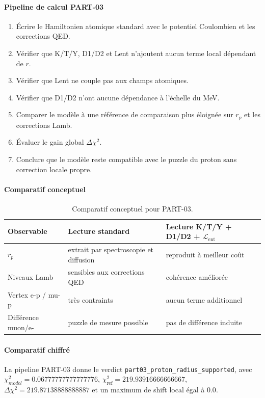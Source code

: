 \documentclass[11pt,a4paper]{article}
\newcommand{\Lent}{\mathcal{L}_{\mathrm{ent}}}
\begin{document}
\paragraph{Pipeline de calcul PART-03}
\begin{enumerate}[leftmargin=*,itemsep=0.2em,topsep=0.2em]
\item Écrire le Hamiltonien atomique standard avec le potentiel Coulombien et les corrections QED.
\item Vérifier que K/T/Y, D1/D2 et Lent n'ajoutent aucun terme local dépendant de $r$.
\item Vérifier que Lent ne couple pas aux champs atomiques.
\item Vérifier que D1/D2 n'ont aucune dépendance à l'échelle du MeV.
\item Comparer le modèle à une référence de comparaison plus éloignée sur $r_p$ et les corrections Lamb.
\item Évaluer le gain global $\Delta\chi^2$.
\item Conclure que le modèle reste compatible avec le puzzle du proton sans correction locale propre.
\end{enumerate}

\paragraph{Comparatif conceptuel}
\begin{table}[htbp]
\centering
\begin{tabular}{>{\raggedright\arraybackslash}p{4cm} >{\raggedright\arraybackslash}p{5.2cm} >{\raggedright\arraybackslash}p{5.2cm}}
\toprule
Observable & Lecture standard & Lecture K/T/Y + D1/D2 + $\Lent$ \\
\midrule
$r_p$ & extrait par spectroscopie et diffusion & reproduit à meilleur coût \\
Niveaux Lamb & sensibles aux corrections QED & cohérence améliorée \\
Vertex e-p / mu-p & très contraints & aucun terme additionnel \\
Différence muon/e- & puzzle de mesure possible & pas de différence induite \\
\bottomrule
\end{tabular}
\caption{Comparatif conceptuel pour PART-03.}
\end{table}

\paragraph{Comparatif chiffré}
La pipeline PART-03 donne le verdict \texttt{part03\_proton\_radius\_supported}, avec $\chi^2_{model}=0.06777777777777776$, $\chi^2_{\mathrm{ref}}=219.93916666666667$, $\Delta\chi^2=219.87138888888887$ et un maximum de shift local égal à $0.0$.
\end{document}
